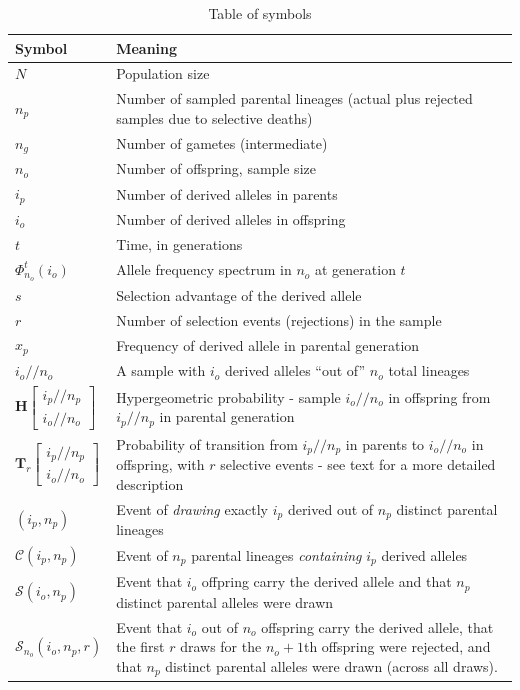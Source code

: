 \documentclass[review]{elsarticle}
\newcommand{\dslash}{/\!\!/}
\newcommand{\Coalc}[4]{\begin{bmatrix}#1\dslash #2 \\ #3\dslash #4 \end{bmatrix}}
\newcommand{\ms}{\mathcal{S}}
\begin{document}
\begin{table}
  \centering
  \begin{tabular}{l|p{100mm}}
    Symbol & Meaning\\
    \hline
    $N$ & Population size\\
    $n_p$ & Number of sampled parental lineages (actual plus rejected samples due to selective deaths)\\
    $n_g$ & Number of gametes (intermediate)\\
    $n_o$ & Number of offspring, sample size\\
    $i_p$ & Number of derived alleles in parents\\
    $i_o$ & Number of derived alleles in offspring\\
    $t$ & Time, in generations\\
    $\Phi_{n_o}^{t}(i_o)$ & Allele frequency spectrum in $n_o$ at generation $t$\\
    $s$ & Selection advantage of the derived allele\\
    $r$ & Number of selection events (rejections) in the sample\\
    $x_p$ & Frequency of derived allele in parental generation\\
    $i_o \dslash n_o$ & A sample with $i_o$ derived alleles ``out of'' $n_o$ total lineages\\
    $\mathbf{H}\Coalc{i_p}{n_p}{i_o}{n_o}$ & Hypergeometric probability -
                                             sample $i_o \dslash n_o$ in offspring from $i_p \dslash n_p$ in parental generation\\
    $\mathbf{T}_{r}\Coalc{i_p}{n_p}{i_o}{n_o}$ & Probability of transition from $i_p \dslash n_p$ in parents
                                                 to $i_o \dslash n_o$ in offspring, with $r$ selective events -
                                                 see text for a more detailed description\\
    \hline
    $(i_p, n_p)$ & Event of \textit{drawing} exactly $i_p$ derived out of $n_p$ distinct parental lineages \\
    $\mathcal{C}(i_p, n_p)$ & Event of $n_p$ parental lineages \textit{containing} $i_p$ derived alleles \\
    $\mathcal{S}(i_o, n_p)$ & Event that  $i_o$ offpring carry the derived allele and that $n_p$ distinct parental alleles were drawn \\
    $\ms_{n_o}(i_o, n_p, r)$ & Event that  $i_o$ out of $n_o$ offspring carry the derived allele, that the first $r$ draws for the 
    $n_o+1$th offspring were rejected, 
    and that $n_p$ distinct parental alleles were drawn (across all draws).
  \end{tabular}
  \caption{\label{tab_symbols} Table of symbols}
\end{table}
\end{document}
